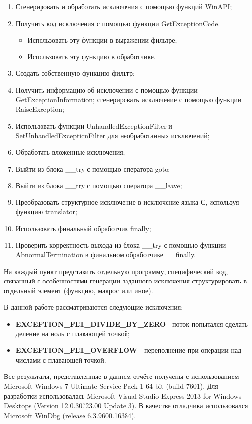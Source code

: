 \documentclass[a4paper, 12pt]{report}		%
\begin{document}
\begin{enumerate}
	\item Сгенерировать и обработать исключения с помощью функций WinAPI;
	\item Получить код исключения с помощью функции GetExceptionCode.
		\begin{itemize}
		\item Использовать эту функции в выражении фильтре;
		\item Использовать эту функцию в обработчике.
		\end{itemize}
	\item Создать собственную функцию-фильтр;
	\item Получить информацию об исключении с помощью функции GetExceptionInformation; сгенерировать исключение с помощью функции RaiseException;
	\item Использовать функции UnhandledExceptionFilter и SetUnhandledExceptionFilter для необработанных исключений;
	\item Обработать вложенные исключения;
	\item Выйти из блока \_\_try с помощью оператора goto;
	\item Выйти из блока \_\_try с помощью оператора \_\_leave;
	\item Преобразовать структурное исключение в исключение языка С, используя функцию translator;
	\item Использовать финальный обработчик finally;
	\item Проверить корректность выхода из блока \_\_try с помощью функции AbnormalTermination в финальном обработчике \_\_finally.
\end{enumerate}

На каждый пункт представить отдельную программу, специфический код, связанный с особенностями генерации заданного исключения структурировать в отдельный элемент (функцию, макрос или иное).

\vspace{1em}
В данной работе рассматриваются следующие исключения:
\begin{itemize}
\item \textbf{EXCEPTION\_FLT\_DIVIDE\_BY\_ZERO} - поток попытался сделать деление на ноль с плавающей точкой;
\item \textbf{EXCEPTION\_FLT\_OVERFLOW} - переполнение при операции над числами с плавающей точкой.
\end{itemize}

\vspace{1em}
Все результаты, представленные в данном отчёте получены с использованием Microsoft Windows 7 Ultimate Service Pack 1 64-bit (build 7601). Для разработки использовалась Microsoft Visual Studio Express 2013 for Windows Desktops (Version 12.0.30723.00 Update 3). В качестве отладчика использовался Microsoft WinDbg (release 6.3.9600.16384).
\end{document}
